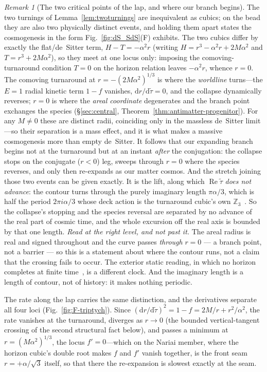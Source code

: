 \documentclass[11pt,a4paper]{article}
\theoremstyle{plain}
\theoremstyle{definition}
\theoremstyle{remark}
\newtheorem{remark}{Remark}
\begin{document}
\begin{remark}[The two critical points of the lap, and where our branch begins]\label{rem:twocritical}
The two turnings of Lemma~\ref{lem:twoturnings} are inequivalent as cubics; on the bead they are also two physically distinct events, and holding them apart states the cosmogenesis in the form Fig.~\ref{fig:dS_SdS}(F) exhibits. The two cubics differ by exactly the flat/de~Sitter term, $H-T=-\alpha^2 r$ (writing $H=r^3-\alpha^2r+2M\alpha^2$ and $T=r^3+2M\alpha^2$), so they meet at one locus only: imposing the comoving-turnaround condition $T=0$ on the horizon relation leaves $-\alpha^2r$, whence $r=0$. The comoving turnaround at $r=-(2M\alpha^2)^{1/3}$ is where the \emph{worldline} turns---the $E{=}1$ radial kinetic term $1-f$ vanishes, $\mathrm{d}r/\mathrm{d}\tilde\tau=0$, and the collapse dynamically reverses; $r=0$ is where the \emph{areal coordinate} degenerates and the branch point exchanges the species (\S\ref{sec:central}, Theorem~\ref{thm:antimatter-progenitor}). For any $M\neq0$ these are distinct radii, coinciding only in the massless de~Sitter limit---so their separation is a mass effect, and it is what makes a massive cosmogenesis more than empty de~Sitter. It follows that our expanding branch begins not at the turnaround but at an instant \emph{after} the conjugation: the collapse stops on the conjugate ($r<0$) leg, sweeps through $r=0$ where the species reverses, and only then re-expands as our matter cosmos. And the stretch joining those two events can be given exactly. It is the lift, along which $\operatorname{Re}\tilde\tau$ \emph{does not advance}: the contour turns through the purely imaginary length $\pi\alpha/3$, which is half the period $2\pi i\alpha/3$ whose deck action is the turnaround cubic's own $\mathbb{Z}_3$~\cite{JanzenSlicing}. So the collapse's stopping and the species reversal are separated by no advance of the real part of cosmic time, and the whole excursion off the real axis is bounded by that one length. \emph{Read at the right level, and not past it.} The areal radius is real and signed throughout and the curve passes \emph{through} $r=0$ --- a branch point, not a barrier --- so this is a statement about where the contour runs, not a claim that the crossing fails to occur. The exterior static reading, in which no horizon completes at finite time~\cite{JanzenBHcausality}, is a different clock. And the imaginary length is a length of contour, not of history: it makes nothing periodic.

The rate along the lap carries the same distinction, and the derivatives separate all four loci (Fig.~\ref{fig:F-triptych}). Since $(\mathrm{d}r/\mathrm{d}\tilde\tau)^2=1-f=2M/r+r^2/\alpha^2$, the rate vanishes at the turnaround, diverges as $r\to0$ (the bounded vertical-tangent crossing of the second structural fact below), and passes a minimum at $r=(M\alpha^2)^{1/3}$, the locus $f'=0$---which on the Nariai member, where the horizon cubic's double root makes $f$ and $f'$ vanish together, is the front seam $r=+\alpha/\sqrt3$ itself, so that there the re-expansion is slowest exactly at the seam.


\end{remark}
\end{document}
